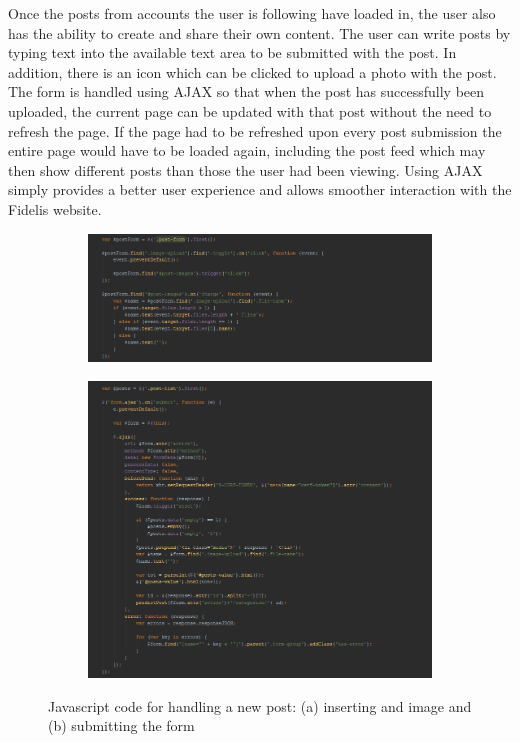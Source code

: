 Once the posts from accounts the user is following have loaded in, the user also has the ability to create and share their own content. The user can write posts by typing text into the available text area to be submitted with the post. In addition, there is an icon which can be clicked to upload a photo with the post. The form is handled using AJAX so that when the post has successfully been uploaded, the current page can be updated with that post without the need to refresh the page. If the page had to be refreshed upon every post submission the entire page would have to be loaded again, including the post feed which may then show different posts than those the user had been viewing. Using AJAX simply provides a better user experience and allows smoother interaction with the Fidelis website.

\begin{figure}[H]
\centering
\begin{subfigure}[b]{1\linewidth}
	\includegraphics[width=\textwidth]{Images/Implementation/HomeNewPostJS}
	\caption{}
	\label{fig:HomeNewPostJS}
\end{subfigure}
\begin{subfigure}[b]{1\linewidth}
	\includegraphics[width=\textwidth]{Images/Implementation/HomeNewPostJS2}
	\caption{}
	\label{fig:HomeNewPostJS2}
\end{subfigure}
\caption{Javascript code for handling a new post: (a) inserting and image and (b) submitting the form}
\label{fig:HomeNewPostJavascript}
\end{figure}

